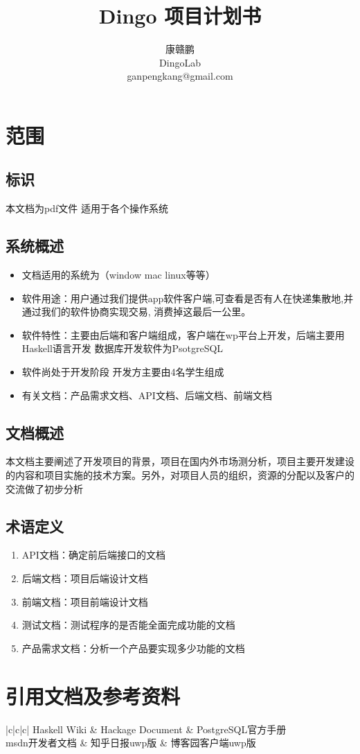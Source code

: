 \documentclass[UTF8]{dingo}
\author{康赣鹏 \\ DingoLab \\ganpengkang@gmail.com}
\title{Dingo 项目计划书}
\begin{document}
  \makecover
  \makecontent
  \section{范围}
	  \subsection{标识}
		  本文档为pdf文件 适用于各个操作系统
	  \subsection{系统概述}
		  \begin{itemize}
		  	\item 文档适用的系统为（window mac linux等等）
		  	\item 软件用途：用户通过我们提供app软件客户端,可查看是否有人在快递集散地,并通过我们的软件协商实现交易, 消费掉这最后一公里。
		  	\item 软件特性：主要由后端和客户端组成，客户端在wp平台上开发，后端主要用Haskell语言开发 数据库开发软件为PsotgreSQL
		  	\item 软件尚处于开发阶段 开发方主要由4名学生组成
		  	\item 有关文档：产品需求文档、API文档、后端文档、前端文档
		  \end{itemize}
		\subsection{文档概述}
			本文档主要阐述了开发项目的背景，项目在国内外市场测分析，项目主要开发建设的内容和项目实施的技术方案。另外，对项目人员的组织，资源的分配以及客户的交流做了初步分析
		\subsection{术语定义}
		\begin{enumerate}
			\item API文档：确定前后端接口的文档
			\item 后端文档：项目后端设计文档
			\item 前端文档：项目前端设计文档
			\item 测试文档：测试程序的是否能全面完成功能的文档
			\item 产品需求文档：分析一个产品要实现多少功能的文档
		\end{enumerate}
  \section{引用文档及参考资料}
	  \begin{array}{|c|c|c|}
	  	\hline
	  	Haskell Wiki & Hackage Document & PostgreSQL官方手册 \\ \hline
	  	msdn开发者文档 & 知乎日报uwp版 & 博客园客户端uwp版 \hline
	  \end{array}
\end{document}
